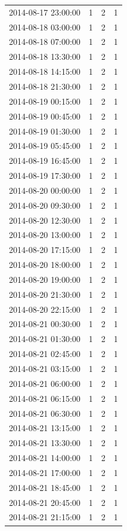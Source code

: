 \begin{tabular}{lrrr}
2014-08-17 23:00:00 & 1 & 2 & 1 \\
2014-08-18 03:00:00 & 1 & 2 & 1 \\
2014-08-18 07:00:00 & 1 & 2 & 1 \\
2014-08-18 13:30:00 & 1 & 2 & 1 \\
2014-08-18 14:15:00 & 1 & 2 & 1 \\
2014-08-18 21:30:00 & 1 & 2 & 1 \\
2014-08-19 00:15:00 & 1 & 2 & 1 \\
2014-08-19 00:45:00 & 1 & 2 & 1 \\
2014-08-19 01:30:00 & 1 & 2 & 1 \\
2014-08-19 05:45:00 & 1 & 2 & 1 \\
2014-08-19 16:45:00 & 1 & 2 & 1 \\
2014-08-19 17:30:00 & 1 & 2 & 1 \\
2014-08-20 00:00:00 & 1 & 2 & 1 \\
2014-08-20 09:30:00 & 1 & 2 & 1 \\
2014-08-20 12:30:00 & 1 & 2 & 1 \\
2014-08-20 13:00:00 & 1 & 2 & 1 \\
2014-08-20 17:15:00 & 1 & 2 & 1 \\
2014-08-20 18:00:00 & 1 & 2 & 1 \\
2014-08-20 19:00:00 & 1 & 2 & 1 \\
2014-08-20 21:30:00 & 1 & 2 & 1 \\
2014-08-20 22:15:00 & 1 & 2 & 1 \\
2014-08-21 00:30:00 & 1 & 2 & 1 \\
2014-08-21 01:30:00 & 1 & 2 & 1 \\
2014-08-21 02:45:00 & 1 & 2 & 1 \\
2014-08-21 03:15:00 & 1 & 2 & 1 \\
2014-08-21 06:00:00 & 1 & 2 & 1 \\
2014-08-21 06:15:00 & 1 & 2 & 1 \\
2014-08-21 06:30:00 & 1 & 2 & 1 \\
2014-08-21 13:15:00 & 1 & 2 & 1 \\
2014-08-21 13:30:00 & 1 & 2 & 1 \\
2014-08-21 14:00:00 & 1 & 2 & 1 \\
2014-08-21 17:00:00 & 1 & 2 & 1 \\
2014-08-21 18:45:00 & 1 & 2 & 1 \\
2014-08-21 20:45:00 & 1 & 2 & 1 \\
2014-08-21 21:15:00 & 1 & 2 & 1 \\

\end{tabular}
